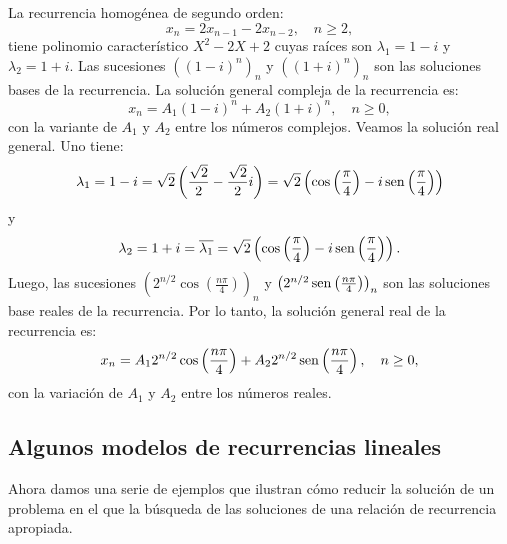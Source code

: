 \begin{example}
	La recurrencia homogénea de segundo orden: \[ x_{n}=2x_{n-1}-2x_{n-2},\quad n\geq2, \] tiene polinomio característico $X^{2}-2X+2$ cuyas raíces son $\lambda_{1}=1-i$ y $\lambda_{2}=1+i$. Las sucesiones ${\left((1-i)^{n}\right)}_{n}$ y ${\left((1+i)^{n}\right)}_{n} $ son las soluciones bases de la recurrencia. La solución general compleja de la recurrencia es: \[ x_{n}=A_{1}{\left(1-i\right)}^{n}+A_{2}{\left(1+i\right)}^{n},\quad n\geq 0, \] con la variante de $A_{1}$ y $A_{2}$ entre los números complejos. Veamos la solución real general. Uno tiene: \[ \lambda_{1}=1-i=\sqrt{2}\left(\frac{\sqrt{2}}{2}-\frac{\sqrt{2}}{2}i\right)=\sqrt{2}\left(\cos\left(\frac{\pi}{4}\right)-i\operatorname{sen}\left(\frac{\pi}{4}\right)\right) \] y \[ \lambda_{2}=1+i=\overline{\lambda_{1}}=\sqrt{2}\left(\cos\left(\frac{\pi}{4}\right)-i\operatorname{sen}\left(\frac{\pi}{4}\right)\right). \] Luego, las sucesiones ${\left(2^{n/2}\cos\left( \frac{n\pi}{4}\right)\right)}_{n}$ y ${\left(2^{n/2}\operatorname{sen}\left(\frac{n\pi}{4}\right)\right)}_{n}$ son las soluciones base reales de la recurrencia. Por lo tanto, la solución general real de la recurrencia es: \[ x_{n}=A_{1}2^{n/2}\cos\left(\frac{n\pi}{4}\right)+A_{2}2^{n/2}\operatorname{sen}\left(\frac{n\pi}{4}\right),\quad n\geq 0, \] con la variación de $A_{1}$ y $A_{2}$ entre los números reales.
\end{example}

\subsection{Algunos modelos de recurrencias lineales}\label{subsec:models}

Ahora damos una serie de ejemplos que ilustran cómo reducir la solución de un problema en el que la búsqueda de las soluciones de una relación de recurrencia apropiada.

